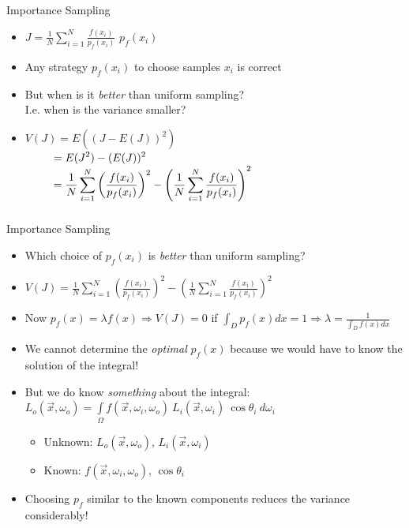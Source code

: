 \documentclass[utf8,stillsansserifmath,fleqn,t]{beamer}
\newcommand{\ds}{\displaystyle}
\begin{document}
\begin{frame}[label=importance-sampling-1]
\frametitle{\insertsection}
Importance Sampling
\begin{itemize}
\item $\ds J = \frac{1}{N}\sum_{i=1}^{N} \frac{f(x_i)}{p_f(x_i)}$ \quad{}\quad $p_f(x_i)$
\item Any strategy $p_f(x_i)$ to choose samples $x_i$ is correct
\item But when is it \emph{better} than uniform sampling?\\
      I.e. when is the variance smaller?
\item $\ds V(J)            = E\left((J-E(J))^2\right)$\\
      $\ds \hphantom{V(J)} = E(J^2) - (E(J))^2$\\
      $\ds \hphantom{V(J)} = \frac{1}{N} \sum_{i=1}^{N} \left(\frac{f(x_i)}{p_f(x_i)}\right)^2
                             - \left(\frac{1}{N} \sum_{i=1}^{N} \frac{f(x_i)}{p_f(x_i)}\right)^2$\\
\end{itemize}
\end{frame}

\begin{frame}[label=importance-sampling-2]
\frametitle{\insertsection}
Importance Sampling
\begin{itemize}
\item Which choice of $p_f(x_i)$ is \emph{better} than uniform sampling?
\item $\ds V(J) = \frac{1}{N} \sum_{i=1}^{N} \left(\frac{f(x_i)}{p_f(x_i)}\right)^2
                  - \left(\frac{1}{N} \sum_{i=1}^{N} \frac{f(x_i)}{p_f(x_i)}\right)^2$
\item Now $p_f(x) = \lambda f(x) \Rightarrow V(J) = 0$ if $\int_D p_f(x)dx =1 \Rightarrow \lambda = \frac{1}{\int_D f(x)dx}$
\item We cannot determine the \emph{optimal} $p_f(x)$ because we would have to know the solution of the integral!
\item But we do know \emph{something} about the integral:\\
    $\displaystyle L_o(\vec{x}, \omega_o) = \int\limits_\Omega
    f(\vec{x},\omega_i,\omega_o)~L_i(\vec{x},\omega_i)~\cos\theta_i~d\omega_i$
    \begin{itemize}
    \item Unknown: $L_o(\vec{x}, \omega_o)$, $L_i(\vec{x},\omega_i)$
    \item Known: $f(\vec{x},\omega_i,\omega_o)$, $\cos\theta_i$
    \end{itemize}
\item Choosing $p_f$ similar to the known components reduces the variance considerably!
\end{itemize}
\end{frame}
\end{document}
